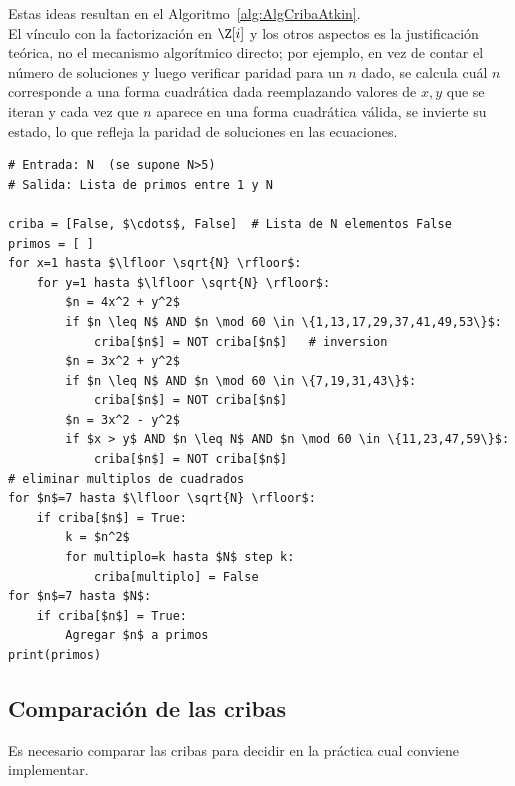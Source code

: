 Estas ideas resultan en el Algoritmo~\ref{alg:AlgCribaAtkin}. \\
El vínculo con la factorización en $\Z[i]$ y los otros aspectos es la justificación teórica, no el mecanismo algorítmico directo; por ejemplo, en vez de contar el número de soluciones y luego verificar paridad para un $n$ dado, se calcula cuál $n$ corresponde a una forma cuadrática dada reemplazando valores de $x,y$ que se iteran y cada vez que $n$ aparece en una forma cuadrática válida, se invierte su estado, lo que refleja la paridad de soluciones en las ecuaciones. \\

\begin{lstlisting}[caption={Criba de Atkin}, label={alg:AlgCribaAtkin}, mathescape=true]
# Entrada: N  (se supone N>5)
# Salida: Lista de primos entre 1 y N

criba = [False, $\cdots$, False]  # Lista de N elementos False
primos = [ ]
for x=1 hasta $\lfloor \sqrt{N} \rfloor$:
    for y=1 hasta $\lfloor \sqrt{N} \rfloor$:
        $n = 4x^2 + y^2$
        if $n \leq N$ AND $n \mod 60 \in \{1,13,17,29,37,41,49,53\}$:
            criba[$n$] = NOT criba[$n$]   # inversion
        $n = 3x^2 + y^2$
        if $n \leq N$ AND $n \mod 60 \in \{7,19,31,43\}$:
            criba[$n$] = NOT criba[$n$]
        $n = 3x^2 - y^2$
        if $x > y$ AND $n \leq N$ AND $n \mod 60 \in \{11,23,47,59\}$:
            criba[$n$] = NOT criba[$n$]
# eliminar multiplos de cuadrados
for $n$=7 hasta $\lfloor \sqrt{N} \rfloor$:
    if criba[$n$] = True:
        k = $n^2$
        for multiplo=k hasta $N$ step k:
            criba[multiplo] = False
for $n$=7 hasta $N$:
    if criba[$n$] = True:
        Agregar $n$ a primos
print(primos)
\end{lstlisting}

\subsection{Comparación de las cribas}
Es necesario comparar las cribas para decidir en la práctica cual conviene implementar.


